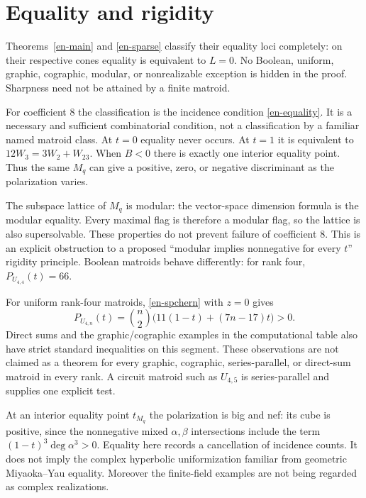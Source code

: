 \documentclass[12pt]{amsart}
\theoremstyle{definition}
\theoremstyle{remark}
\numberwithin{equation}{section}
\begin{document}
\section{Equality and rigidity}
Theorems~\ref{en-main} and \ref{en-sparse} classify their equality loci completely: on their respective cones equality is equivalent to $L=0$. No Boolean, uniform, graphic, cographic, modular, or nonrealizable exception is hidden in the proof. Sharpness need not be attained by a finite matroid.

For coefficient $8$ the classification is the incidence condition \eqref{en-equality}. It is a necessary and sufficient combinatorial condition, not a classification by a familiar named matroid class. At $t=0$ equality never occurs. At $t=1$ it is equivalent to $12W_3=3W_2+W_{23}$. When $B<0$ there is exactly one interior equality point. Thus the same $M_q$ can give a positive, zero, or negative discriminant as the polarization varies.

The subspace lattice of $M_q$ is modular: the vector-space dimension formula is the modular equality. Every maximal flag is therefore a modular flag, so the lattice is also supersolvable. These properties do not prevent failure of coefficient $8$. This is an explicit obstruction to a proposed ``modular implies nonnegative for every $t$'' rigidity principle. Boolean matroids behave differently: for rank four, $P_{U_{4,4}}(t)=66$.

For uniform rank-four matroids, \eqref{en-spchern} with $z=0$ gives
\[
 P_{U_{4,n}}(t)=\binom n2\bigl(11(1-t)+(7n-17)t\bigr)>0.
\]
Direct sums and the graphic/cographic examples in the computational table also have strict standard inequalities on this segment. These observations are not claimed as a theorem for every graphic, cographic, series-parallel, or direct-sum matroid in every rank. A circuit matroid such as $U_{4,5}$ is series-parallel and supplies one explicit test.

At an interior equality point $t_{M_q}$ the polarization is big and nef: its cube is positive, since the nonnegative mixed $\alpha,\beta$ intersections include the term $(1-t)^3\deg\alpha^3>0$. Equality here records a cancellation of incidence counts. It does not imply the complex hyperbolic uniformization familiar from geometric Miyaoka--Yau equality. Moreover the finite-field examples are not being regarded as complex realizations.
\end{document}

